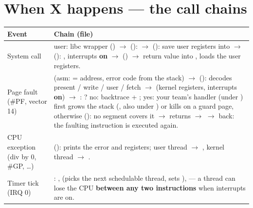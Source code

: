 \section{When X happens --- the call chains}

\begin{center}
\small
\begin{longtable}{L{2.6cm}L{12.2cm}}
\toprule
\textbf{Event} & \textbf{Chain (file)} \\
\midrule
\endhead
System call &
user: libc wrapper () $\to$  (): 
$\to$  (): save user registers into 
$\to$  (): , interrupts \textbf{on}
$\to$  ()
$\to$ return value into ,  loads the user registers. \\
\addlinespace
Page fault (\#PF, vector 14) &
 (asm:  = address, error code from the stack)
$\to$  (): decodes present / write / user / fetch
$\to$  (kernel registers, interrupts \textbf{on})
$\to$ : ? no: backtrace + ;
yes: your team's handler (under ) first grows the stack (, also under ) or kills on a guard page, otherwise  (): no segment covers it $\to$ returns  $\to$ 
$\to$ back: the faulting instruction is executed again. \\
\addlinespace
CPU exception (div by 0, \#GP, \ldots) &
 (): prints the error and registers; user thread $\to$ , kernel thread $\to$ . \\
\addlinespace
Timer tick (IRQ 0) &
: ,  (picks the next schedulable thread, sets ),  --- a thread can lose the CPU \textbf{between any two instructions} when interrupts are on. \\

\end{longtable}
\end{center}
